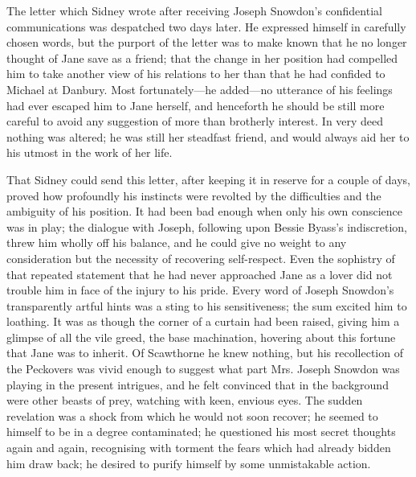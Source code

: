 The letter which Sidney wrote after receiving Joseph Snowdon's
confidential communications was despatched two days later. He expressed
himself in carefully chosen words, but the purport of the letter was to
make known that he no longer thought of Jane save
{\protect\hypertarget{16}{}{}}as a friend; that the change in her
position had compelled him to take another view of his relations to her
than that he had confided to Michael at Danbury. Most fortunately---he
added---no utterance of his feelings had ever escaped him to Jane
herself, and henceforth he should be still more careful to avoid any
suggestion of more than brotherly interest. In very deed nothing was
altered; he was still her steadfast friend, and would always aid her to
his utmost in the work of her life.

That Sidney could send this letter, after keeping it in reserve for a
couple of days, proved how profoundly his instincts were revolted by the
difficulties and the ambiguity of his position. It had been bad enough
when only his own conscience was in play; the dialogue with Joseph,
following upon Bessie Byass's indiscretion, threw him wholly off his
balance, and he could give no weight to any consideration but the
necessity of recovering self-respect. Even the sophistry of that
repeated statement that he had never approached Jane as a lover did not
trouble him in face of the injury to his pride. Every
{\protect\hypertarget{17}{}{}}word of Joseph Snowdon's transparently
artful hints was a sting to his sensitiveness; the sum excited him to
loathing. It was as though the corner of a curtain had been raised,
giving him a glimpse of all the vile greed, the base machination,
hovering about this fortune that Jane was to inherit. Of Scawthorne he
knew nothing, but his recollection of the Peckovers was vivid enough to
suggest what part Mrs. Joseph Snowdon was playing in the present
intrigues, and he felt convinced that in the background were other
beasts of prey, watching with keen, envious eyes. The sudden revelation
was a shock from which he would not soon recover; he seemed to himself
to be in a degree contaminated; he questioned his most secret thoughts
again and again, recognising with torment the fears which had already
bidden him draw back; he desired to purify himself by some unmistakable
action.

